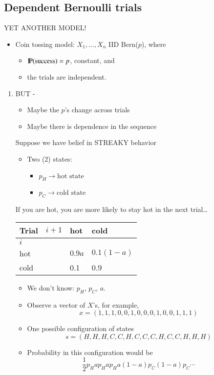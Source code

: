 \documentclass[11pt,english]{scrbook}
\begin{document}
\subsection{Dependent Bernoulli trials}
\label{sec:org1136234}
YET ANOTHER MODEL!

\begin{itemize}
\item Coin tossing model: \(X_{1},\ldots, X_{n}\) IID Bern(\(p\)), where 
\begin{itemize}
\item \(\P(\mbox{success}) = p\), constant, and
\item the trials are independent.
\end{itemize}
\end{itemize}

\begin{enumerate}
\item BUT -
\label{sec:org4d4f39c}
\begin{itemize}
\item Maybe the \(p\)'s change across trials
\item Maybe there is dependence in the sequence
\end{itemize}

Suppose we have belief in STREAKY behavior
\begin{itemize}
\item Two (2) states:
\begin{itemize}
\item \(p_{H} \to \mbox{hot state}\)
\item \(p_{C} \to \mbox{cold state}\)
\end{itemize}
\end{itemize}

If you are hot, you are more likely to stay hot in the next trial\ldots{}

\begin{center}
\begin{tabular}{llll}
Trial & \(i + 1\) & hot & cold\\
\hline
\(i\) &  &  & \\
hot &  & \(0.9a\) & \(0.1(1 - a)\)\\
cold &  & 0.1 & 0.9\\
\end{tabular}
\end{center}

\begin{itemize}
\item We don't know: \(p_{H}\), \(p_{C}\), \(a\).
\item Observe a vector of \(X\)'s, for example,
\[
  x = (1,1,1,0,0,1,0,0,0,1,0,0,1,1,1)
  \]
\item One possible configuration of states
\[
  s = (H,H,H,C,C,H,C,C,C,H,C,C,H,H,H)
  \]
\item Probability in this configuration would be
\[
  \frac{1}{2}p_{H}ap_{H}ap_{H}a(1-a)p_{C}(1-a)p_{C}\cdots
  \]
\end{itemize}


\end{enumerate}
\end{document}
